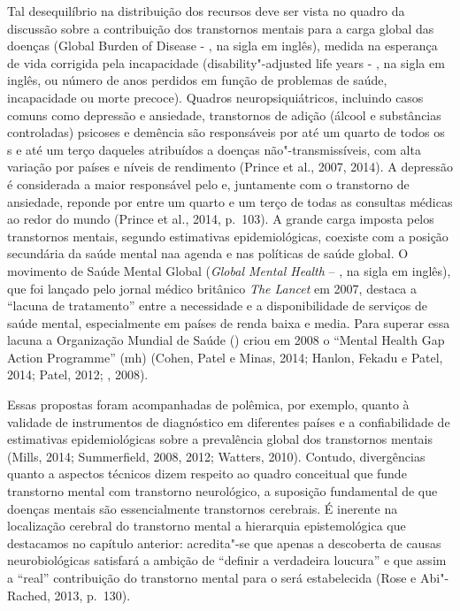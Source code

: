 Tal desequilíbrio na distribuição dos recursos deve ser vista no quadro
da discussão sobre a contribuição dos transtornos mentais para a carga
global das doenças (Global Burden of Disease - , na sigla em inglês),
medida na esperança de vida corrigida pela incapacidade
(disability"-adjusted life years - , na sigla em inglês, ou número
de anos perdidos em função de problemas de saúde, incapacidade ou morte
precoce). Quadros neuropsiquiátricos, incluindo casos comuns como
depressão e ansiedade, transtornos de adição (álcool e substâncias
controladas) psicoses e demência são responsáveis por até um quarto de
todos os s e até um terço daqueles atribuídos a doenças
não"-transmissíveis, com alta variação por países e níveis de rendimento
(Prince et al., 2007, 2014). A depressão é considerada a maior
responsável pelo  e, juntamente com o transtorno de ansiedade,
reponde por entre um quarto e um terço de todas as consultas médicas ao
redor do mundo (Prince et al., 2014, p.~103). A grande carga imposta
pelos transtornos mentais, segundo estimativas epidemiológicas, coexiste
com a posição secundária da saúde mental naa agenda e nas políticas de
saúde global. O movimento de Saúde Mental Global (\emph{Global Mental
Health} -- , na sigla em inglês), que foi lançado pelo jornal médico
britânico \emph{The Lancet} em 2007, destaca a ``lacuna de tratamento''
entre a necessidade e a disponibilidade de serviços de saúde mental,
especialmente em países de renda baixa e media. Para superar essa lacuna
a Organização Mundial de Saúde () criou em 2008 o ``Mental Health Gap
Action Programme'' (mh) (Cohen, Patel e Minas, 2014; Hanlon, Fekadu e
Patel, 2014; Patel, 2012; , 2008).

Essas propostas foram acompanhadas de polêmica, por exemplo, quanto à
validade de instrumentos de diagnóstico em diferentes países e a
confiabilidade de estimativas epidemiológicas sobre a prevalência global
dos transtornos mentais (Mills, 2014; Summerfield, 2008, 2012; Watters,
2010). Contudo, divergências quanto a aspectos técnicos dizem respeito
ao quadro conceitual que funde transtorno mental com transtorno
neurológico, a suposição fundamental de que doenças mentais são
essencialmente transtornos cerebrais. É inerente na localização cerebral
do transtorno mental a hierarquia epistemológica que destacamos no
capítulo anterior: acredita"-se que apenas a descoberta de causas
neurobiológicas satisfará a ambição de ``definir a verdadeira loucura''
e que assim a ``real'' contribuição do transtorno mental para o  será
estabelecida (Rose e Abi"-Rached, 2013, p.~130).

